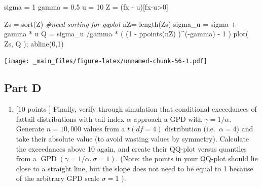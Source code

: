 \documentclass[
  oneside]{book}
\newenvironment{Shaded}{\begin{snugshade}}{\end{snugshade}}
\newcommand{\CommentTok}[1]{\textcolor[rgb]{0.56,0.35,0.01}{\textit{#1}}}
\newcommand{\DecValTok}[1]{\textcolor[rgb]{0.00,0.00,0.81}{#1}}
\newcommand{\FloatTok}[1]{\textcolor[rgb]{0.00,0.00,0.81}{#1}}
\newcommand{\FunctionTok}[1]{\textcolor[rgb]{0.00,0.00,0.00}{#1}}
\newcommand{\NormalTok}[1]{#1}
\newcommand{\OtherTok}[1]{\textcolor[rgb]{0.56,0.35,0.01}{#1}}
\newcommand{\SpecialCharTok}[1]{\textcolor[rgb]{0.00,0.00,0.00}{#1}}
\providecommand{\tightlist}{%
  \setlength{\itemsep}{0pt}\setlength{\parskip}{0pt}}
\begin{document}
\begin{Shaded}
\begin{Highlighting}[]
\NormalTok{sigma }\OtherTok{=} \DecValTok{1}
\NormalTok{gamma }\OtherTok{=} \FloatTok{0.5}
\NormalTok{u }\OtherTok{=} \DecValTok{10}
\NormalTok{Z }\OtherTok{=}\NormalTok{ (fx }\SpecialCharTok{{-}}\NormalTok{ u)[fx}\SpecialCharTok{{-}}\NormalTok{u}\SpecialCharTok{\textgreater{}}\DecValTok{0}\NormalTok{]}

\NormalTok{Zs }\OtherTok{=} \FunctionTok{sort}\NormalTok{(Z) }\CommentTok{\#need sorting for qqplot}
\NormalTok{nZ}\OtherTok{=} \FunctionTok{length}\NormalTok{(Zs)}
\NormalTok{sigma\_u }\OtherTok{=}\NormalTok{ sigma }\SpecialCharTok{+}\NormalTok{ gamma }\SpecialCharTok{*}\NormalTok{ u}
\NormalTok{Q }\OtherTok{=}\NormalTok{ sigma\_u }\SpecialCharTok{/}\NormalTok{gamma }\SpecialCharTok{*}\NormalTok{ ( (}\DecValTok{1} \SpecialCharTok{{-}} \FunctionTok{ppoints}\NormalTok{(nZ) )}\SpecialCharTok{\^{}}\NormalTok{(}\SpecialCharTok{{-}}\NormalTok{gamma) }\SpecialCharTok{{-}} \DecValTok{1}\NormalTok{ ) }
\FunctionTok{plot}\NormalTok{( Zs, Q ); }\FunctionTok{abline}\NormalTok{(}\DecValTok{0}\NormalTok{,}\DecValTok{1}\NormalTok{)}
\end{Highlighting}
\end{Shaded}

\texttt{[image: \_main\_files/figure-latex/unnamed-chunk-56-1.pdf]}

\hypertarget{part-d-1}{%
\subsection{Part D}\label{part-d-1}}

\begin{enumerate}
\def\labelenumi{(\alph{enumi})}
\setcounter{enumi}{3}
\tightlist
\item
  {[}10 points \(]\) Finally, verify through simulation that conditional exceedances of fattail distributions with tail index \(\alpha\) approach a GPD with \(\gamma=1 / \alpha\). Generate \(n=10,000\) values from a \(t(d f=4)\) distribution (i.e.~\(\alpha=4)\) and take their absolute value (to avoid wasting values by symmetry). Calculate the exceedances above 10 again, and create their QQ-plot versus quantiles from a \(\operatorname{GPD}(\gamma=1 / \alpha, \sigma=1)\). (Note: the points in your QQ-plot should lie close to a straight line, but the slope does not need to be equal to 1 because of the arbitrary GPD scale \(\sigma=1\) ).
\end{enumerate}
\end{document}
